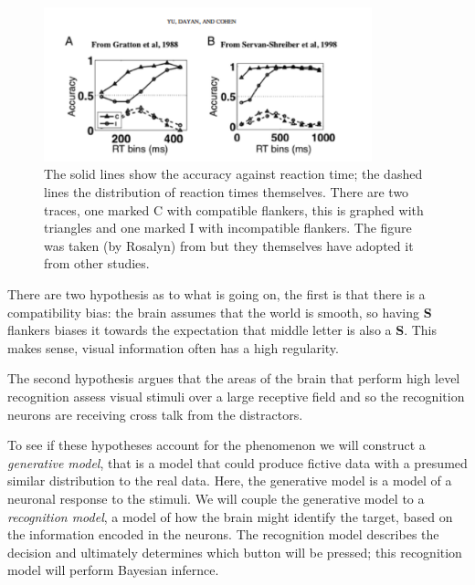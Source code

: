 \documentclass[12pt]{article}
\begin{document}
\begin{figure}[tb]
\begin{center}
  \includegraphics[width=9.5cm]{fig_rt_accurate.png}
\end{center}
\caption{The solid lines show the accuracy against reaction time; the
  dashed lines the distribution of reaction times themselves. There
  are two traces, one marked C with compatible flankers, this is
  graphed with triangles and one marked I with incompatible
  flankers. The figure was taken (by Rosalyn) from
  \cite{YuDayanCohen2009} but they themselves have adopted it from
  other studies. \label{fig_rt_accurate}}
\end{figure}

There are two hypothesis as to what is going on, the first is that
there is a compatibility bias: the brain assumes that the world is
smooth, so having \textbf{S} flankers biases it towards the
expectation that middle letter is also a \textbf{S}. This makes sense,
visual information often has a high regularity.

The second hypothesis argues that the areas of the brain that perform
high level recognition assess visual stimuli over a large receptive
field and so the recognition neurons are receiving cross talk from the
distractors.

To see if these hypotheses account for the phenomenon we will
construct a \textsl{generative model}, that is a model that could
produce fictive data with a presumed similar distribution to the real
data. Here, the generative model is a model of a neuronal response to
the stimuli. We will couple the generative model to a
\textsl{recognition model}, a model of how the brain might identify
the target, based on the information encoded in the neurons. The
recognition model describes the decision and ultimately determines
which button will be pressed; this recognition model will perform
Bayesian infernce.
\end{document}
